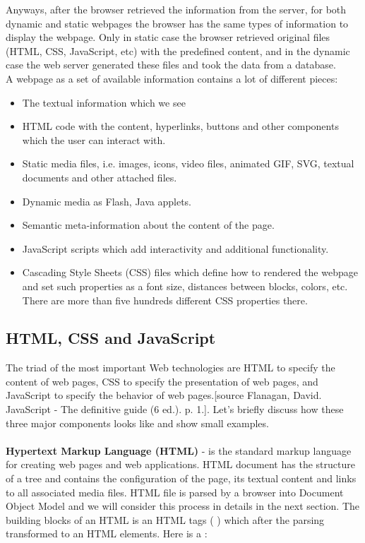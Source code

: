 Anyways, after the browser retrieved the information from the server, for both dynamic and static webpages the browser has the same types of information to display the webpage. Only in static case the browser retrieved original files (HTML, CSS, JavaScript, etc)  with the predefined content, and in the dynamic case the web server generated these files and took the data from a database.\\

A webpage as a set of available information contains a lot of different pieces:

\begin{itemize}
    \item The textual information which we see
    \item HTML code with the content, hyperlinks, buttons and other components which the user can interact with.
    \item Static media files, i.e. images, icons, video files, animated GIF, SVG, textual documents and other attached files.
    \item Dynamic media as Flash, Java applets.
    \item Semantic meta-information about the content of the page.
    \item JavaScript scripts which add interactivity and additional functionality.
    \item Cascading Style Sheets (CSS) files which define how to rendered the webpage and set such properties as a font size, distances between blocks, colors, etc. There are more than five hundreds different CSS properties there.
\end{itemize}

\subsection{HTML, CSS and JavaScript}
The triad of the most important Web technologies are HTML to specify the content of web pages, CSS to specify the presentation of web pages, and JavaScript to specify the behavior of web pages.[source Flanagan, David. JavaScript - The definitive guide (6 ed.). p. 1.]. Let's briefly discuss how these three major components looks like and show small examples.\\
[source https://www.w3schools.com]\\

\noindent\textbf{Hypertext Markup Language (HTML)} - is the standard markup language for creating web pages and web applications. HTML document has the structure of a tree and contains the configuration of the page, its textual content and links to all associated media files. HTML file is parsed by a browser into Document Object Model and we will consider this process in details in the next section. The building blocks of an HTML is an HTML tags ( )  which after the parsing transformed to an HTML elements. Here is a : \\

